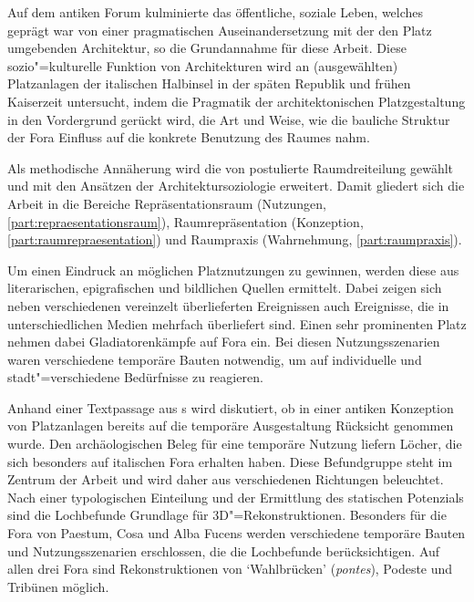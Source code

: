

\label{formalia:abstract}
\addsec{\thesisTitle}%
Auf dem antiken Forum kulminierte das öffentliche, soziale Leben,
welches geprägt war
von einer pragmatischen Auseinandersetzung mit der den Platz umgebenden Architektur,
so die Grundannahme  für diese Arbeit.
Diese  sozio"=kulturelle Funktion von Architekturen wird an (ausgewählten) Platzanlagen der italischen Halbinsel in der späten Republik und frühen Kaiserzeit untersucht,
indem die Pragmatik der architektonischen Platzgestaltung in den Vordergrund gerückt wird, \idest die Art und Weise, wie die  bauliche Struktur der Fora Einfluss auf die konkrete Benutzung des Raumes nahm.

Als methodische Annäherung wird die von \citeauthor{Lefebvre_2000} postulierte Raumdreiteilung gewählt und mit den Ansätzen der Architektursoziologie erweitert.
Damit gliedert sich die Arbeit in die Bereiche
Repräsentationsraum (Nutzungen, \cref{part:repraesentationsraum}),
Raumrepräsentation (Konzeption, \cref{part:raumrepraesentation})
und Raumpraxis (Wahrnehmung, \cref{part:raumpraxis}).

Um einen Eindruck an möglichen Platznutzungen zu gewinnen,
werden diese aus literarischen, epigrafischen und bildlichen Quellen ermittelt.
Dabei zeigen sich neben verschiedenen vereinzelt überlieferten Ereignissen
auch Ereignisse, die in unterschiedlichen Medien mehrfach überliefert sind.
Einen sehr prominenten Platz nehmen dabei Gladiatorenkämpfe auf Fora ein.
Bei diesen Nutzungsszenarien waren verschiedene temporäre Bauten notwendig,
um auf individuelle und stadt"=verschiedene Bedürfnisse zu reagieren.

Anhand einer Textpassage aus \citeauthor{Vitr}s  wird diskutiert,
ob in einer antiken Konzeption von Platzanlagen bereits auf die temporäre Ausgestaltung Rücksicht genommen wurde.
Den archäologischen Beleg für eine temporäre Nutzung liefern Löcher,
die sich besonders auf italischen Fora erhalten haben.
Diese Befundgruppe steht im Zentrum der Arbeit und wird daher aus verschiedenen Richtungen beleuchtet.
Nach einer typologischen Einteilung und der
 Ermittlung des statischen Potenzials sind die Lochbefunde Grundlage für 3D"=Rekonstruktionen.
Besonders für die Fora von Paestum, Cosa und Alba Fucens werden verschiedene temporäre Bauten und Nutzungsszenarien erschlossen,
die die Lochbefunde berücksichtigen.
Auf allen drei Fora sind Rekonstruktionen von \enquote*{Wahlbrücken} (\emph{pontes}), Podeste und Tribünen möglich.

